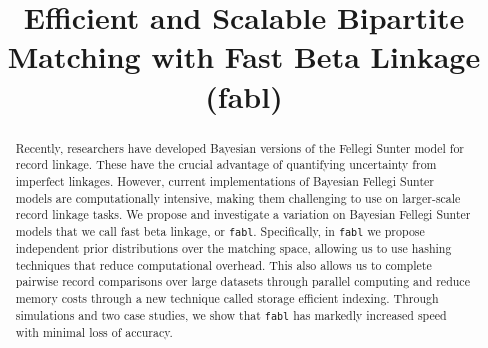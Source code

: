 \documentclass[ba]{imsart}
\begin{document}
\linenumbers
\begin{frontmatter}
\title{Efficient and Scalable Bipartite Matching with Fast Beta Linkage  (fabl)}



\begin{abstract}
Recently, researchers have developed Bayesian versions of the Fellegi Sunter model for record linkage. These have the crucial advantage of quantifying uncertainty from imperfect linkages.  However, current implementations of Bayesian Fellegi Sunter models are computationally intensive, making them challenging to use on larger-scale record linkage tasks.  We propose and investigate a variation on Bayesian Fellegi Sunter models that we call fast beta linkage, or \texttt{fabl}.  Specifically, in \texttt{fabl} we propose independent prior distributions over the matching space, allowing us to use hashing techniques that reduce computational overhead. This also allows us to complete pairwise record comparisons over large datasets through parallel computing and reduce memory costs through a new technique called storage efficient indexing. Through simulations and two case studies, we show that \texttt{fabl} has markedly increased speed with minimal loss of accuracy.
\end{abstract}

\begin{keyword}%
\end{keyword}

\end{frontmatter}
\end{document}
